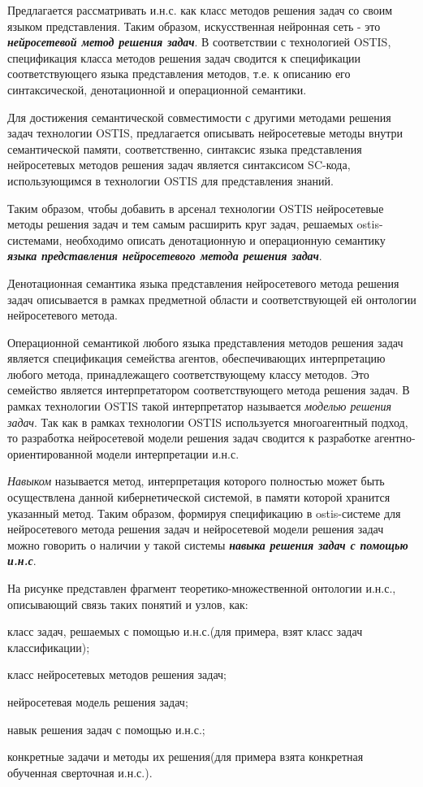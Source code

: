 Предлагается рассматривать и.н.с. как класс методов решения задач со своим языком представления. Таким образом, искусственная нейронная сеть - это \textbf{\textit{нейросетевой метод решения задач}}. В соответствии с технологией OSTIS, спецификация класса методов решения задач сводится к спецификации соответствующего языка представления методов, т.е. к описанию его синтаксической, денотационной и операционной семантики.

Для достижения семантической совместимости с другими методами решения задач технологии OSTIS, предлагается описывать нейросетевые методы внутри семантической памяти, соответственно, синтаксис языка представления нейросетевых методов решения задач является синтаксисом SC-кода, использующимся в технологии OSTIS для представления знаний.

Таким образом, чтобы добавить в арсенал технологии OSTIS нейросетевые методы решения задач и тем самым расширить круг задач, решаемых ostis-системами, необходимо описать денотационную и операционную семантику \textbf{\textit{языка представления нейросетевого метода решения задач}}.

Денотационная семантика языка представления нейросетевого метода решения задач описывается в рамках предметной области и соответствующей ей онтологии нейросетевого метода.

Операционной семантикой любого языка представления методов решения задач является спецификация семейства агентов, обеспечивающих интерпретацию любого метода, принадлежащего соответствующему классу методов. Это семейство является интерпретатором соответствующего метода решения задач. В рамках технологии OSTIS такой интерпретатор называется \textit{моделью решения задач}. Так как в рамках технологии OSTIS используется многоагентный подход, то разработка нейросетевой модели решения задач сводится к разработке агентно-ориентированной модели интерпретации и.н.с.

\textit{Навыком} называется метод, интерпретация которого полностью может быть осуществлена данной кибернетической системой, в памяти которой хранится указанный метод. Таким образом, формируя спецификацию в ostis-системе для нейросетевого метода решения задач и нейросетевой модели решения задач можно говорить о наличии у такой системы \textbf{\textit{навыка решения задач с помощью и.н.с}}.

На рисунке \textit{} представлен фрагмент теоретико-множественной онтологии и.н.с., описывающий связь таких понятий и узлов, как:
\begin{textitemize}
	\item класс задач, решаемых с помощью и.н.с.(для примера, взят класс задач классификации);
	\item класс нейросетевых методов решения задач;
	\item нейросетевая модель решения задач;
	\item навык решения задач с помощью и.н.с.;
	\item конкретные задачи и методы их решения(для примера взята конкретная обученная сверточная и.н.с.).
\end{textitemize}

